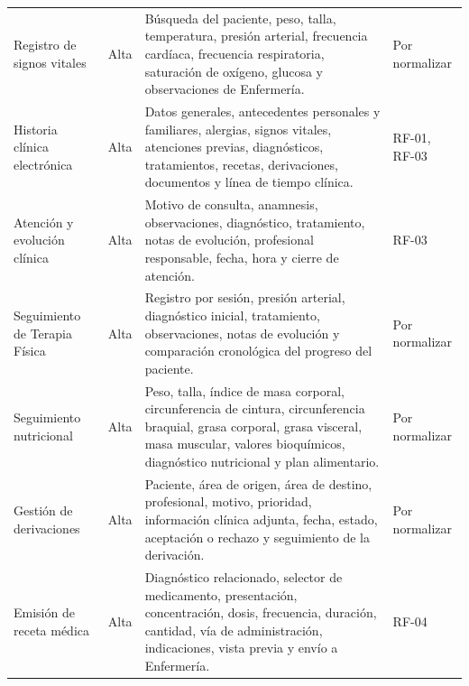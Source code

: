 \documentclass[11pt,a4paper]{article}
\begin{document}
\begin{longtable}{p{} p{} p{} p{}}
		Registro de signos vitales &
		Alta &
		Búsqueda del paciente, peso, talla, temperatura, presión arterial, frecuencia
		cardíaca, frecuencia respiratoria, saturación de oxígeno, glucosa y
		observaciones de Enfermería. &
		Por normalizar \\
		
		Historia clínica electrónica &
		Alta &
		Datos generales, antecedentes personales y familiares, alergias, signos vitales,
		atenciones previas, diagnósticos, tratamientos, recetas, derivaciones,
		documentos y línea de tiempo clínica. &
		RF-01, RF-03 \\
		
		Atención y evolución clínica &
		Alta &
		Motivo de consulta, anamnesis, observaciones, diagnóstico, tratamiento, notas de
		evolución, profesional responsable, fecha, hora y cierre de atención. &
		RF-03 \\
		
		Seguimiento de Terapia Física &
		Alta &
		Registro por sesión, presión arterial, diagnóstico inicial, tratamiento,
		observaciones, notas de evolución y comparación cronológica del progreso del
		paciente. &
		Por normalizar \\
		
		Seguimiento nutricional &
		Alta &
		Peso, talla, índice de masa corporal, circunferencia de cintura, circunferencia
		braquial, grasa corporal, grasa visceral, masa muscular, valores bioquímicos,
		diagnóstico nutricional y plan alimentario. &
		Por normalizar \\
		
		Gestión de derivaciones &
		Alta &
		Paciente, área de origen, área de destino, profesional, motivo, prioridad,
		información clínica adjunta, fecha, estado, aceptación o rechazo y seguimiento
		de la derivación. &
		Por normalizar \\
		
		Emisión de receta médica &
		Alta &
		Diagnóstico relacionado, selector de medicamento, presentación, concentración,
		dosis, frecuencia, duración, cantidad, vía de administración, indicaciones,
		vista previa y envío a Enfermería. &
		RF-04 \\
		

\end{longtable}
\end{document}
